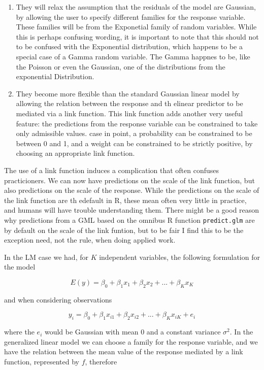 \documentclass[
]{book}
\begin{document}
\begin{enumerate}
\def\labelenumi{\arabic{enumi}.}
\item
  They will relax the assumption that the residuals of the model are Gaussian, by allowing the user to specify different families for the response variable. These families will be from the Exponetial family of random variables. While this is perhaps confusing wording, it is important to note that this should not to be confused with the Exponential distribution, which happens to be a special case of a Gamma random variable. The Gamma happnes to be, like the Poisson or even the Gaussian, one of the distributions from the exponential Distribution.
\item
  They become more flexible than the standard Gaussian linear model by allowing the relation between the response and th elinear predictor to be mediated via a link function. This link function adds another very useful feature: the predictions from the response variable can be constrained to take only admissible values. case in point, a probability can be constrained to be between 0 and 1, and a weight can be constrained to be strictly positive, by choosing an appropriate link function.
\end{enumerate}

The use of a link function induces a complication that often confuses practicioners. We can now have predictions on the scale of the link function, but also predictions on the scale of the response. While the predictions on the scale of the link function are th edefault in R, these mean often very little in practice, and humans will have trouble understanding them. There might be a good reason why predictions from a GML based on the omnibus R function \texttt{predict.glm} are by default on the scale of the link funtion, but to be fair I find this to be the exception need, not the rule, when doing applied work.

In the LM case we had, for \(K\) independent variables, the following formulation for the model

\[E(y)=\beta_0+\beta_1x_1+\beta_2x_2+...+\beta_Kx_K\]

and when considering observations

\[y_i=\beta_0+\beta_1x_{i1}+\beta_2x_{i2}+...+\beta_Kx_{iK}+e_i\]

where the \(e_i\) would be Gaussian with mean 0 and a constant variance \(\sigma^2\). In the generalized linear model we can choose a family for the response variable, and we have the relation between the mean value of the response mediated by a link function, represented by \(f\), therefore
\end{document}
